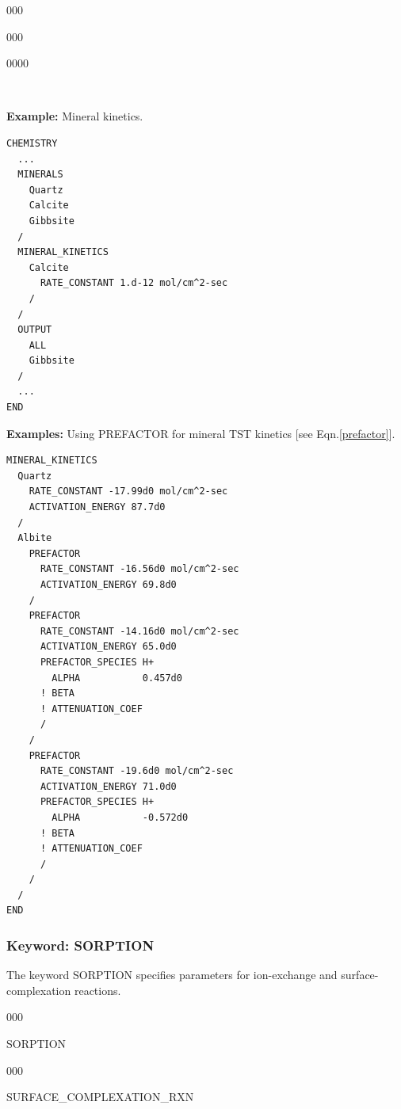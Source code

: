 \begin{deflist}{000}
\begin{deflist}{000}
\begin{deflist}{0000}
~\\

\item [\keyend]
\end{deflist}
\item [\keyend] ~
\end{deflist}

\begin{mdframed}
{\bf Example:} Mineral kinetics.
\footnotesize
\begin{verbatim}
CHEMISTRY
  ...
  MINERALS
    Quartz
    Calcite
    Gibbsite
  /
  MINERAL_KINETICS
    Calcite
      RATE_CONSTANT 1.d-12 mol/cm^2-sec
    /
  /
  OUTPUT
    ALL
    Gibbsite
  /
  ...
END
\end{verbatim}
\normalsize
\end{mdframed}

\begin{mdframed}
\noindent
{\bf Examples:}
Using PREFACTOR for mineral TST kinetics [see Eqn.\eqref{prefactor}].
\footnotesize
\begin{verbatim}
MINERAL_KINETICS
  Quartz 
    RATE_CONSTANT -17.99d0 mol/cm^2-sec
    ACTIVATION_ENERGY 87.7d0
  /
  Albite 
    PREFACTOR
      RATE_CONSTANT -16.56d0 mol/cm^2-sec
      ACTIVATION_ENERGY 69.8d0
    /
    PREFACTOR
      RATE_CONSTANT -14.16d0 mol/cm^2-sec
      ACTIVATION_ENERGY 65.0d0
      PREFACTOR_SPECIES H+
        ALPHA           0.457d0
      ! BETA
      ! ATTENUATION_COEF
      /
    /
    PREFACTOR
      RATE_CONSTANT -19.6d0 mol/cm^2-sec
      ACTIVATION_ENERGY 71.0d0
      PREFACTOR_SPECIES H+
        ALPHA           -0.572d0
      ! BETA
      ! ATTENUATION_COEF
      /
    /
  /
END
\end{verbatim}
\normalsize
\end{mdframed}

\hfill\hyperlink{target_key}{\return}
\clearpage
\protect\hypertarget{target_chem_sorb}{}

\subsubsection{Keyword: SORPTION}

The keyword SORPTION specifies parameters for ion-exchange and surface-complexation reactions.

\hfill\hyperlink{target_key}{\return}

\begin{deflist}{000}
\item[SORPTION] ~
\begin{deflist}{000}
\item[SURFACE\_COMPLEXATION\_RXN] ~


\end{deflist}
\end{deflist}
\end{deflist}
